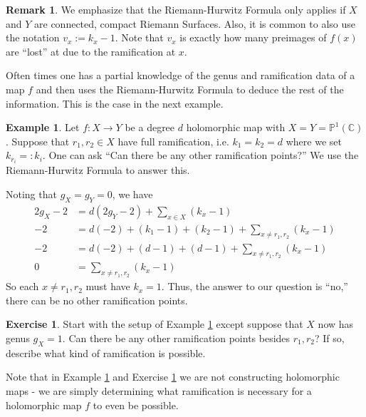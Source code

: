 \documentclass[12pt]{book}%
\theoremstyle{plain}
\theoremstyle{definition}
\newtheorem{example}[theorem]{Example}
\newtheorem{exercise}{Exercise}
\newtheorem{remark}[theorem]{Remark}
\theoremstyle{remark}
\def\to{\rightarrow}
\newcommand{\PoneC}{{\mathbb P}^1({\mathbb C})}
\begin{document}
\begin{figure}
\label{illustrationOfRHFormula}
\end{figure}


\begin{remark}
We emphasize that the Riemann-Hurwitz Formula only applies if $X$ and $Y$ are connected, compact Riemann Surfaces. Also, it is common to also use the notation $v_x := k_x - 1$. Note that $v_x$ is exactly how many preimages of $f(x)$ are ``lost'' at due to the ramification at $x$.
\end{remark}

Often times one has a partial knowledge of the genus and ramification data of a map $f$ and then uses the Riemann-Hurwitz Formula to deduce the rest of the information. This is the case in the next example.

\begin{example}
\label{twoPointsFullRamExample}
Let $f:X \to Y$ be a degree $d$ holomorphic map with $X=Y=\PoneC$. Suppose that $r_1,r_2 \in X$ have full ramification, i.e. $k_1 = k_2 = d$  where we set $k_{r_i}=: k_i$. One can ask ``Can there be any other ramification points?'' We use the Riemann-Hurwitz Formula to answer this.

Noting that $g_X=g_Y=0$, we have 
\begin{align*}
2g_X-2 &= d(2g_Y-2) + \sum_{x \in X} (k_x-1) \\
-2 &= d(-2) + (k_1-1) + (k_2-1) + \sum_{x \neq r_1,r_2} (k_x-1) \\
-2 &= d(-2) + (d-1) + (d-1) + \sum_{x \neq r_1,r_2} (k_x-1) \\
0 &= \sum_{x \neq r_1,r_2} (k_x-1)
\end{align*}
So each $x\neq r_1,r_2$ must have $k_x = 1$. Thus, the answer to our question is ``no,'' there can be no other ramification points.
\end{example}

\begin{exercise}
\label{twoPointsFullRamGone}
Start with the setup of Example \ref{twoPointsFullRamExample} except suppose that $X$ now has genus $g_X=1$. Can there be any other ramification points besides $r_1,r_2$? If so, describe what kind of ramification is possible.
\end{exercise}

Note that in Example \ref{twoPointsFullRamExample} and Exercise \ref{twoPointsFullRamGone} we are not constructing holomorphic maps - we are simply determining what ramification is necessary for a holomorphic map $f$ to even be possible.
\end{document}
